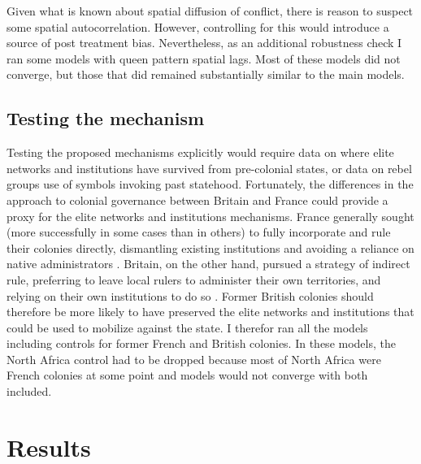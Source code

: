 \documentclass[12pt]{article}
\begin{document}
Given what is known about spatial diffusion of conflict, there is reason to
suspect some spatial autocorrelation. However, controlling for this would
introduce a source of post treatment bias. Nevertheless, as an additional
robustness check I ran some models with queen pattern spatial lags. Most of
these models did not converge, but those that did remained substantially similar
to the main models.

\subsection{Testing the mechanism} \label{Testing the mechanism}

Testing the proposed mechanisms explicitly would require data on where elite
networks and institutions have survived from pre-colonial states, or data on
rebel groups use of symbols invoking past statehood. Fortunately, the
differences in the approach to colonial governance between Britain and France
could provide a proxy for the elite networks and institutions mechanisms. France
generally sought (more successfully in some cases than in others) to fully
incorporate and rule their colonies directly, dismantling existing institutions
and avoiding a reliance on native administrators \citep{Blanton_2001}. Britain,
on the other hand, pursued a strategy of indirect rule, preferring to leave
local rulers to administer their own territories, and relying on their own
institutions to do so \citep{Blanton_2001}. Former British colonies should
therefore be more likely to have preserved the elite networks and institutions
that could be used to mobilize against the state. I therefor ran all the models
including controls for former French and British colonies. In these models, the
North Africa control had to be dropped because most of North Africa were French
colonies at some point and models would not converge with both included. 

\section{Results} \label{Results}
\end{document}
